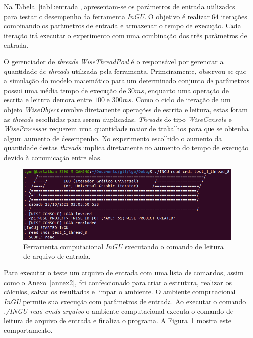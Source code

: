 Na Tabela~\ref{tab1:entrada}, apresentam-se os parâmetros de entrada utilizados para testar o desempenho da ferramenta \textit{InGU}. O objetivo é realizar $64$ iterações combinando os parâmetros de entrada e armazenar o tempo de execução. Cada iteração irá executar o experimento com uma combinação dos três parâmetros de entrada.

O gerenciador de \textit{threads} \textit{WiseThreadPool} é o responsável por gerenciar a quantidade de \textit{threads} utilizada pela ferramenta. Primeiramente, observou-se que a simulação do modelo matemático para um determinado conjunto de parâmetros possui uma média tempo de execução de $30 ms$, enquanto uma operação de escrita e leitura demora entre $100$ e $300 ms$. Como o ciclo de iteração de um objeto \textit{WiseObject} envolve diretamente operações de escrita e leitura, estas foram as \textit{threads} escolhidas para serem duplicadas. \textit{Threads} do tipo \textit{WiseConsole} e \textit{WiseProcessor} requerem uma quantidade maior de trabalhos para que se obtenha algum aumento de desempenho. No experimento escolhido o aumento da quantidade destas \textit{threads} implica diretamente no aumento do tempo de execução devido à comunicação entre elas.




\begin{figure}[!htbp]
	\centering
	\includegraphics[width=\linewidth]{Figures/INGU.png}
	\caption{Ferramenta computacional \textit{InGU} executando o comando de leitura de arquivo de entrada.}
	\label{fig:INGU}
\end{figure}

Para executar o teste um arquivo de entrada com uma lista de comandos, assim como o Anexo~\ref{annex2}, foi confeccionado para criar a estrutura, realizar os cálculos, salvar os resultados e limpar o ambiente. O ambiente computacional \textit{InGU} permite sua execução com parâmetros de entrada. Ao executar o comando \textit{./INGU read cmds arquivo} o ambiente computacional executa o comando de leitura de arquivo de entrada e finaliza o programa. A Figura~\ref{fig:INGU} mostra este comportamento.

